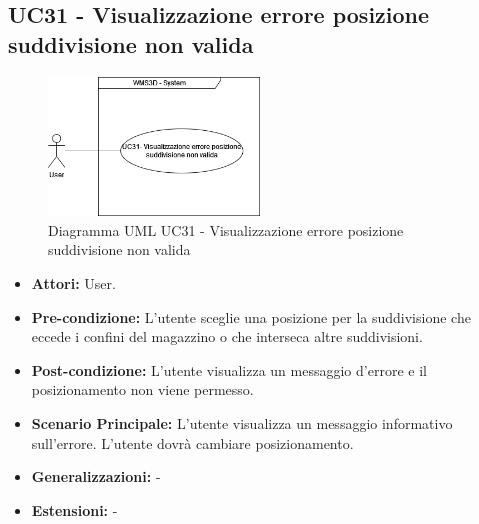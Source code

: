 \subsection{UC31 - Visualizzazione errore posizione suddivisione non valida}
\begin{figure}[H]
  \centering
  \includegraphics[width=0.5\textwidth]{UC_diagrams_28-32/UC31_sys.drawio.png}
  \caption{Diagramma UML UC31 - Visualizzazione errore posizione suddivisione non valida}
\end{figure}
\begin{itemize}
    \item \textbf{Attori:} User.
    \item \textbf{Pre-condizione:} L'utente sceglie una posizione per la suddivisione che eccede i confini del magazzino o che interseca altre suddivisioni.
    \item \textbf{Post-condizione:} L'utente visualizza un messaggio d'errore e il posizionamento non viene permesso.
    \item \textbf{Scenario Principale:} L'utente visualizza un messaggio informativo sull'errore. L'utente dovrà cambiare posizionamento.
    \item \textbf{Generalizzazioni:} -
    \item \textbf{Estensioni:} -
\end{itemize}